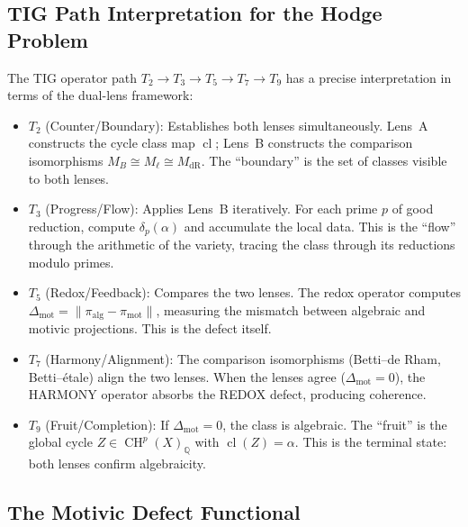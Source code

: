 \documentclass[11pt]{article}
\theoremstyle{definition}
\DeclareMathOperator{\cl}{cl}
\DeclareMathOperator{\CH}{CH}
\begin{document}
\subsection{TIG Path Interpretation for the Hodge Problem}
\label{sec:tig-path-interpretation}

The TIG operator path $T_2 \to T_3 \to T_5 \to T_7 \to T_9$ has a
precise interpretation in terms of the dual-lens framework:

\begin{itemize}
  \item $T_2$ (Counter/Boundary): Establishes both lenses simultaneously.
    Lens~A constructs the cycle class map $\cl$; Lens~B constructs the
    comparison isomorphisms $M_B \cong M_\ell \cong M_{\mathrm{dR}}$.
    The ``boundary'' is the set of classes visible to both lenses.

  \item $T_3$ (Progress/Flow): Applies Lens~B iteratively.  For each
    prime $p$ of good reduction, compute $\delta_p(\alpha)$ and accumulate
    the local data.  This is the ``flow'' through the arithmetic of the
    variety, tracing the class through its reductions modulo primes.

  \item $T_5$ (Redox/Feedback): Compares the two lenses.  The redox
    operator computes $\Delta_{\mathrm{mot}} = \|\pi_{\mathrm{alg}} -
    \pi_{\mathrm{mot}}\|$, measuring the mismatch between algebraic and
    motivic projections.  This is the defect itself.

  \item $T_7$ (Harmony/Alignment): The comparison isomorphisms
    (Betti--de Rham, Betti--\'etale) align the two lenses.  When the
    lenses agree ($\Delta_{\mathrm{mot}} = 0$), the HARMONY operator
    absorbs the REDOX defect, producing coherence.

  \item $T_9$ (Fruit/Completion): If $\Delta_{\mathrm{mot}} = 0$, the
    class is algebraic.  The ``fruit'' is the global cycle
    $Z \in \CH^p(X)_{\mathbb{Q}}$ with $\cl(Z) = \alpha$.  This is the
    terminal state: both lenses confirm algebraicity.
\end{itemize}

\subsection{The Motivic Defect Functional}
\end{document}
